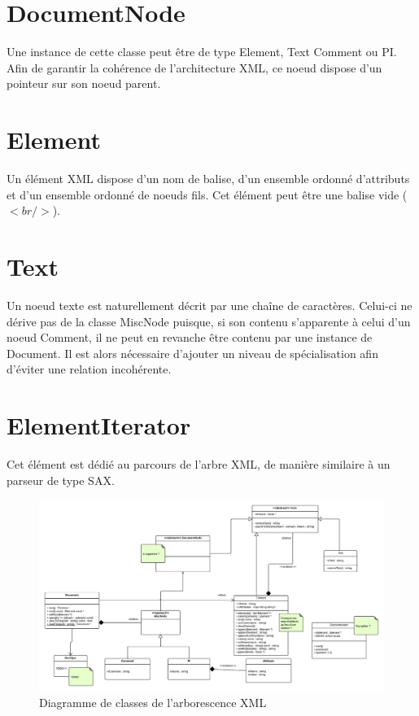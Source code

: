 \section{DocumentNode}
Une instance de cette classe peut être de type Element, Text Comment ou PI. Afin de garantir la cohérence de l'architecture XML, ce noeud dispose d'un pointeur sur son noeud parent.

\section{Element}
Un élément XML dispose d'un nom de balise, d'un ensemble ordonné d'attributs et d'un ensemble ordonné de noeuds fils. Cet élément peut être une balise vide ($<br/>$).

\section{Text}
Un noeud texte est naturellement décrit par une chaîne de caractères. Celui-ci ne dérive pas de la classe MiscNode puisque, si son contenu s'apparente à celui d'un noeud Comment, il ne peut en revanche être contenu par une instance de Document. Il est alors nécessaire d'ajouter un niveau de spécialisation afin d'éviter une relation incohérente.

\section{ElementIterator}
Cet élément est dédié au parcours de l'arbre XML, de manière similaire à un parseur de type SAX.

\begin{landscape}
\begin{figure}[h!]
    \centering
    \includegraphics[width=\linewidth]{images/classDiagram.png}
    \caption{Diagramme de classes de l'arborescence XML}
    \label{classDiagram}
\end{figure}
\end{landscape}
